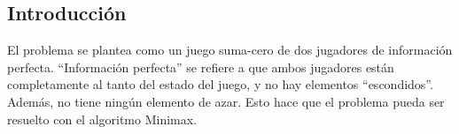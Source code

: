 \documentclass{article}
\begin{document}
\begin{multicols}{2}


\section{Introducción}

El problema se plantea como un juego suma-cero \footnotemark de dos
jugadores de información perfecta. ``Información perfecta'' se refiere
a que ambos jugadores están completamente al tanto del estado del
juego, y no hay elementos ``escondidos''. Además, no tiene ningún
elemento de azar. Esto hace que el problema pueda ser resuelto con el
algoritmo Minimax\cite{norvig-russell}.
\\



\end{multicols}
\end{document}
